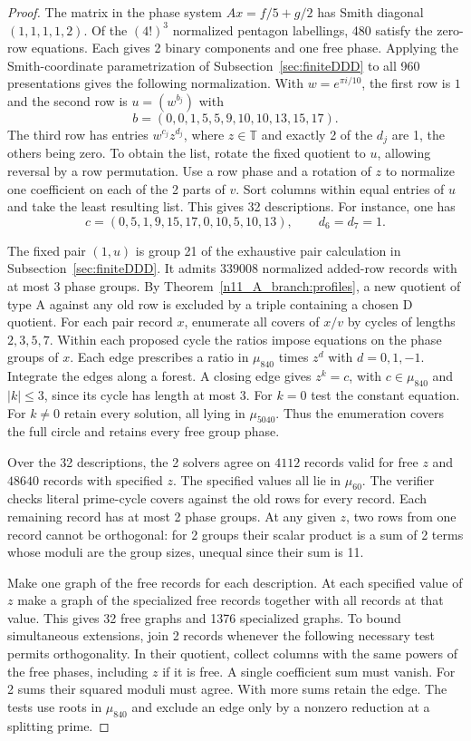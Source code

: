 \documentclass[11pt,a4paper]{article}
\theoremstyle{plain}
\theoremstyle{definition}
\theoremstyle{plain}
\begin{document}
\begin{proof}
The matrix in the phase system $Ax=f/5+g/2$ has Smith diagonal $(1,1,1,1,2)$. Of the $(4!)^3$ normalized pentagon labellings, 480 satisfy the zero-row equations. Each gives 2 binary components and one free phase. Applying the Smith-coordinate parametrization of Subsection~\ref{sec:finiteDDD} to all 960 presentations gives the following normalization. With $w=e^{\pi i/10}$, the first row is $1$ and the second row is $u=(w^{b_j})$ with
$$b=(0,0,1,5,5,9,10,10,13,15,17).$$
The third row has entries $w^{c_j}z^{d_j}$, where $z\in\mathbb T$ and exactly 2 of the $d_j$ are 1, the others being zero. To obtain the list, rotate the fixed quotient to $u$, allowing reversal by a row permutation. Use a row phase and a rotation of $z$ to normalize one coefficient on each of the 2 parts of $v$. Sort columns within equal entries of $u$ and take the least resulting list. This gives 32 descriptions. For instance, one has
$$c=(0,5,1,9,15,17,0,10,5,10,13),\qquad d_6=d_7=1.$$

The fixed pair $(1,u)$ is group 21 of the exhaustive pair calculation in Subsection~\ref{sec:finiteDDD}. It admits $339008$ normalized added-row records with at most 3 phase groups. By Theorem~\ref{n11_A_branch:profiles}, a new quotient of type $\mathrm{A}$ against any old row is excluded by a triple containing a chosen $\mathrm{D}$ quotient. For each pair record $x$, enumerate all covers of $x/v$ by cycles of lengths $2,3,5,7$. Within each proposed cycle the ratios impose equations on the phase groups of $x$. Each edge prescribes a ratio in $\mu_{840}$ times $z^d$ with $d=0,1,-1$. Integrate the edges along a forest. A closing edge gives $z^k=c$, with $c\in\mu_{840}$ and $|k|\le3$, since its cycle has length at most 3. For $k=0$ test the constant equation. For $k\ne0$ retain every solution, all lying in $\mu_{5040}$. Thus the enumeration covers the full circle and retains every free group phase.

Over the 32 descriptions, the 2 solvers agree on $4112$ records valid for free $z$ and $48640$ records with specified $z$. The specified values all lie in $\mu_{60}$. The verifier checks literal prime-cycle covers against the old rows for every record. Each remaining record has at most 2 phase groups. At any given $z$, two rows from one record cannot be orthogonal: for 2 groups their scalar product is a sum of 2 terms whose moduli are the group sizes, unequal since their sum is 11.

Make one graph of the free records for each description. At each specified value of $z$ make a graph of the specialized free records together with all records at that value. This gives 32 free graphs and 1376 specialized graphs. To bound simultaneous extensions, join 2 records whenever the following necessary test permits orthogonality. In their quotient, collect columns with the same powers of the free phases, including $z$ if it is free. A single coefficient sum must vanish. For 2 sums their squared moduli must agree. With more sums retain the edge. The tests use roots in $\mu_{840}$ and exclude an edge only by a nonzero reduction at a splitting prime.


\end{proof}
\end{document}
